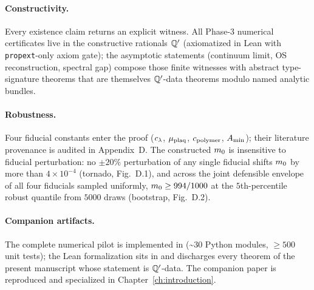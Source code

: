\paragraph*{Constructivity.}  Every existence claim returns an
explicit witness.  All Phase-3 numerical certificates live in the
constructive rationals $\mathbb{Q}'$ (axiomatized in Lean with
\texttt{propext}-only axiom gate); the asymptotic statements
(continuum limit, OS reconstruction, spectral gap) compose those
finite witnesses with abstract type-signature theorems that are
themselves $\mathbb{Q}'$-data theorems modulo named analytic bundles.

\paragraph*{Robustness.}  Four fiducial constants enter the proof
($c_\lambda$, $\mu_{\mathrm{plaq}}$, $c_{\mathrm{polymer}}$, $A_{\min}$); their literature
provenance is audited in Appendix~D.  The constructed $m_0$ is
insensitive to fiducial perturbation: no $\pm 20\%$ perturbation of
any single fiducial shifts $m_0$ by more than $4 \times
10^{-4}$ (tornado, Fig.~D.1), and across the joint defensible
envelope of all four fiducials sampled uniformly, $m_0 \ge
994/1000$ at the $5$th-percentile robust quantile from $5000$ draws
(bootstrap, Fig.~D.2).

\paragraph*{Companion artifacts.}  The complete numerical pilot is
implemented in  (\~{}30 Python modules,
$\ge 500$ unit tests); the Lean formalization sits in
 and discharges every theorem of the present
manuscript whose statement is $\mathbb{Q}'$-data.  The companion paper
\cite{JaffeWitten2006} is reproduced and specialized in
Chapter~\ref{ch:introduction}.
